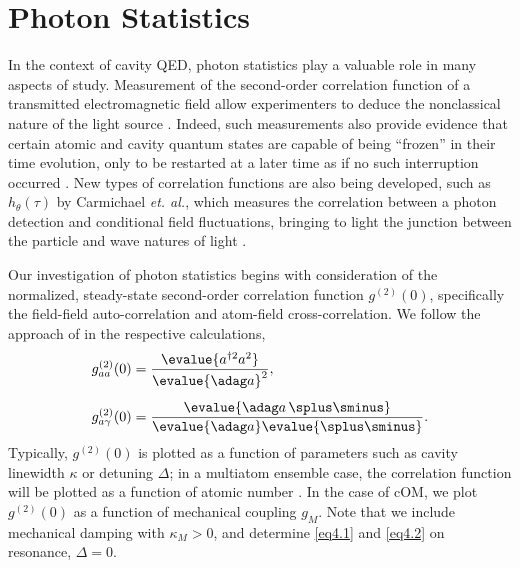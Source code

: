 \section{Photon Statistics}
In the context of cavity QED, photon statistics play a valuable role in many aspects of study. Measurement of the second-order correlation function of a transmitted electromagnetic field allow experimenters to deduce the nonclassical nature of the light source \cite{leach2003}. Indeed, such measurements also provide evidence that certain atomic and cavity quantum states are capable of being ``frozen'' in their time evolution, only to be restarted at a later time as if no such interruption occurred \cite{leach2003}. New types of correlation functions are also being developed, such as $h_{\theta}(\tau)$ by Carmichael \emph{et. al.}, which measures the correlation between a photon detection and conditional field fluctuations, bringing to light the junction between the particle and wave natures of light \cite{leach2003}.

Our investigation of photon statistics begins with consideration of the normalized, steady-state second-order correlation function $g^{(2)}(0)$, specifically the field-field auto-correlation and atom-field cross-correlation. We follow the approach of \cite{brecha1999} in the respective calculations,
%
\begin{align} g^{(2)}_{aa}(0) &= \frac{\evalue{a^{\dag 2} a^2}}{\evalue{\adag a}^2}, \label{eq4.1} \\[5pt]
g^{(2)}_{a\gamma}(0) &= \frac{\evalue{\adag a \, \splus\sminus}}{\evalue{\adag a} \evalue{\splus\sminus}}. \label{eq4.2} \end{align}
%
Typically, $g^{(2)}(0)$ is plotted as a function of parameters such as cavity linewidth $\kappa$ or detuning $\Delta$; in a multiatom ensemble case, the correlation function will be plotted as a function of atomic number \cite{brecha1999}. In the case of cOM, we plot $g^{(2)}(0)$ as a function of mechanical coupling $g_M$. Note that we include mechanical damping with $\kappa_M > 0$, and determine \eqref{eq4.1} and \eqref{eq4.2} on resonance, $\Delta = 0$.

